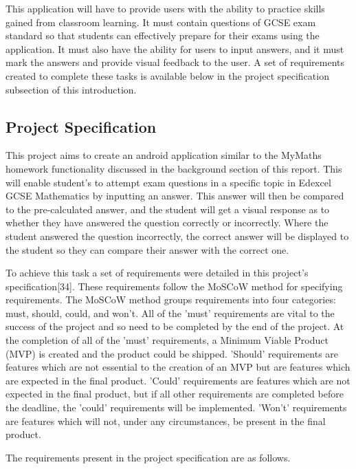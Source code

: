 \documentclass{article}
\begin{document}
This application will have to provide users with the ability to practice skills gained from classroom learning. It must contain questions of GCSE exam standard so that students can effectively prepare for their exams using the application. It must also have the ability for users to input answers, and it must mark the answers and provide visual feedback to the user. A set of requirements created to complete these tasks is available below in the project specification subsection of this introduction. \par

\subsection{Project Specification}

This project aims to create an android application similar to the MyMaths homework functionality discussed in the background section of this report. This will enable student's to attempt exam questions in a specific topic in Edexcel GCSE Mathematics by inputting an answer. This answer will then be compared to the pre-calculated answer, and the student will get a visual response as to whether they have answered the question correctly or incorrectly. Where the student answered the question incorrectly, the correct answer will be displayed to the student so they can compare their answer with the correct one. \par

To achieve this task a set of requirements were detailed in this project's specification[34]. These requirements follow the MoSCoW method for specifying requirements. The MoSCoW method groups requirements into four categories: must, should, could, and won't. All of the 'must' requirements are vital to the success of the project and so need to be completed by the end of the project. At the completion of all of the 'must' requirements, a Minimum Viable Product (MVP) is created and the product could be shipped. 'Should' requirements are features which are not essential to the creation of an MVP but are features which are expected in the final product. 'Could' requirements are features which are not expected in the final product, but if all other requirements are completed before the deadline, the 'could' requirements will be implemented. 'Won't' requirements are features which will not, under any circumstances, be present in the final product. \par

The requirements present in the project specification are as follows. \par
\end{document}
